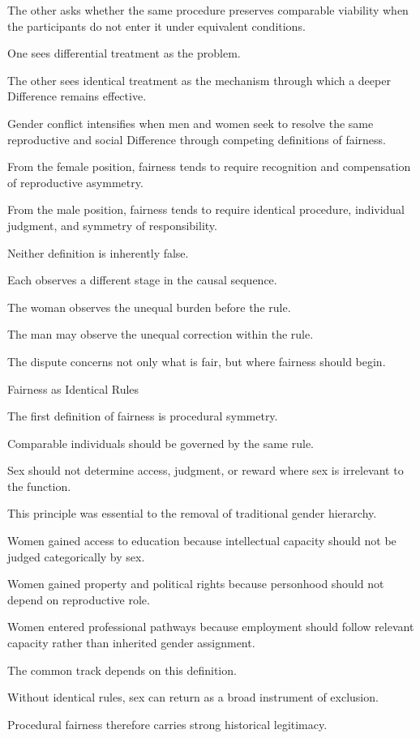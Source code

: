 The other asks whether the same procedure preserves comparable viability when the participants do not enter it under equivalent conditions.

One sees differential treatment as the problem.

The other sees identical treatment as the mechanism through which a deeper Difference remains effective.

Gender conflict intensifies when men and women seek to resolve the same reproductive and social Difference through competing definitions of fairness.

From the female position, fairness tends to require recognition and compensation of reproductive asymmetry.

From the male position, fairness tends to require identical procedure, individual judgment, and symmetry of responsibility.

Neither definition is inherently false.

Each observes a different stage in the causal sequence.

The woman observes the unequal burden before the rule.

The man may observe the unequal correction within the rule.

The dispute concerns not only what is fair, but where fairness should begin.

Fairness as Identical Rules

The first definition of fairness is procedural symmetry.

Comparable individuals should be governed by the same rule.

Sex should not determine access, judgment, or reward where sex is irrelevant to the function.

This principle was essential to the removal of traditional gender hierarchy.

Women gained access to education because intellectual capacity should not be judged categorically by sex.

Women gained property and political rights because personhood should not depend on reproductive role.

Women entered professional pathways because employment should follow relevant capacity rather than inherited gender assignment.

The common track depends on this definition.

Without identical rules, sex can return as a broad instrument of exclusion.

Procedural fairness therefore carries strong historical legitimacy.


